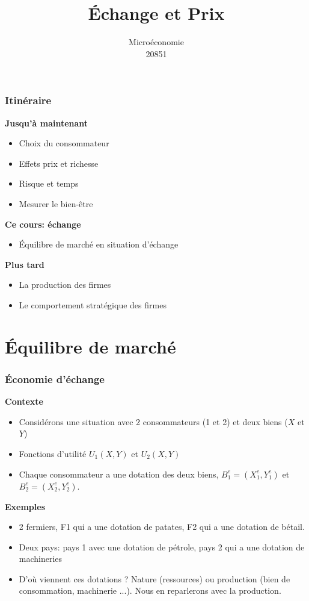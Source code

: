 \documentclass[handout]{beamer}
\title{Échange et Prix}
\author{Microéconomie \\ 20851}
\date{}
\newenvironment{iPar}[1]{\textbf{#1} \begin{itemize}}{\end{itemize}}
\newcommand{\mdp}{\medskip \pause}
\begin{document}
\frame{\titlepage}

\section[Outline]{}
\frame{\tableofcontents}

\section{}


\begin{frame}\frametitle{Itinéraire}

\begin{iPar}{Jusqu'à maintenant}
\item Choix du consommateur
\item Effets prix et richesse
\item Risque et temps
\item Mesurer le bien-être
\end{iPar}\mdp

\begin{iPar}{Ce cours: échange}
\item Équilibre de marché en situation d'échange
\end{iPar}\mdp

\begin{iPar}{Plus tard}
\item  La production des firmes
\item Le comportement stratégique des firmes
\end{iPar}


\end{frame}

\section{Équilibre de marché}

\begin{frame}\frametitle{Économie d'échange}

\begin{iPar}{Contexte} \item Considérons une situation avec 2 consommateurs (1 et
2) et deux biens ($X$ et $Y$) \item Fonctions d'utilité $U_1(X,Y)$ et
$U_2(X,Y)$ \item Chaque consommateur a une dotation des deux biens, $B_1^e = (X_1^e,Y_1^e)$ et $B_2^e = (X_2^e,Y_2^e)$. \end{iPar}
\mdp


\begin{iPar}{Exemples} \item 2 fermiers, F1 qui a une dotation de patates, F2 qui a une dotation de bétail. \item  Deux pays: pays 1
avec une dotation de pétrole, pays 2 qui a une dotation de machineries \item D'où viennent ces dotations ? Nature (ressources) ou production
(bien de consommation, machinerie ...). Nous en reparlerons avec la production. 
\end{iPar}

\end{frame}
\end{document}

